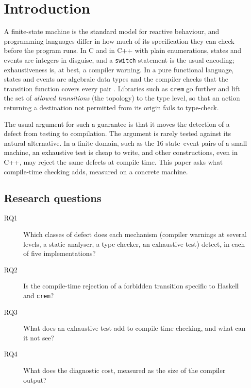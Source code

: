\documentclass[review,12pt]{elsarticle}
\newcommand{\code}[1]{\texttt{#1}}
\newcommand{\crem}{\texttt{crem}}
\begin{document}
\linenumbers

\section{Introduction}
\label{sec:intro}

A finite-state machine is the standard model for reactive behaviour, and programming languages differ in how much of its specification they can check before the program runs. In C and in C++ with plain enumerations, states and events are integers in disguise, and a \code{switch} statement is the usual encoding; exhaustiveness is, at best, a compiler warning. In a pure functional language, states and events are algebraic data types and the compiler checks that the transition function covers every pair \cite{hutton2016haskell}. Libraries such as \crem{} \cite{perone2023crem} go further and lift the set of \emph{allowed transitions} (the topology) to the type level, so that an action returning a destination not permitted from its origin fails to type-check.

The usual argument for such a guarantee is that it moves the detection of a defect from testing to compilation. The argument is rarely tested against its natural alternative. In a finite domain, such as the 16 state--event pairs of a small machine, an exhaustive test is cheap to write, and other constructions, even in C++, may reject the same defects at compile time. This paper asks what compile-time checking adds, measured on a concrete machine.

\subsection{Research questions}
\label{sec:rqs}

\begin{description}
\item[RQ1] Which classes of defect does each mechanism (compiler warnings at several levels, a static analyser, a type checker, an exhaustive test) detect, in each of five implementations?
\item[RQ2] Is the compile-time rejection of a forbidden transition specific to Haskell and \crem{}?
\item[RQ3] What does an exhaustive test add to compile-time checking, and what can it not see?
\item[RQ4] What does the diagnostic cost, measured as the size of the compiler output?
\end{description}
\end{document}
